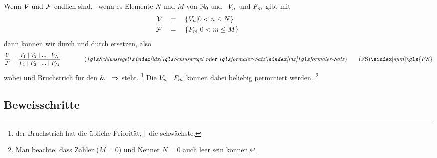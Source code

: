 Wenn $\prerequisiteset$ und $\conclusionset$ endlich sind, \textdh\ wenn es Elemente $N$ und $M$ von $\mathbb{N}_0$ und \Aussagen\ $V_n$ und $F_m$ gibt mit
\begin{align}
	\mathcal{V} & \quad = \quad \{V_n | 0 < n \le N \}
	\label{def:Voraussetzungen} \\
	\mathcal{F}     & \quad = \quad \{F_m     | 0 < m \le M \}
	\label{def:Folgerungen} &&&&&&&&&&
\end{align}
dann können wir \seqqt{$\prerequisiteset$} durch  und \seqqt{$\conclusionset$} durch  ersetzen, also \textzB\
\[
	\frac{\prerequisiteset}{\conclusionset} =
	\frac
		{\prerequisite_1 \srand \prerequisite_2 \srand ...\srand \prerequisite_N}
		{\conclusion_1     \srand \conclusion_2     \srand ...\srand \conclusion_M    }
	\qquad \qquad \text{(\emph{\glsIdx{Schlussregel}} oder \emph{\formalerSatz})}
	\tag{\tagFS} \sym{\gls{FS}} \label{def:formalerSatz}
\]
wobei \chrqt{$\srand$} und Bruchstrich für den  $\&$ \textbzw\ $\Rightarrow$ steht.%
\footnote{%
	der Bruchstrich hat die übliche Priorität, $\srand$ die schwächste.
}
Die $V_n$ \textbzw\ $F_m$ können dabei beliebig permutiert werden.%
\footnote{%
	Man beachte, dass Zähler ($M=0$) und Nenner $N=0$ auch leer sein können.
}

\subsection{Beweisschritte}%
\label{sub:Beweisschritte}
\hidden{\Beweisschritt}

